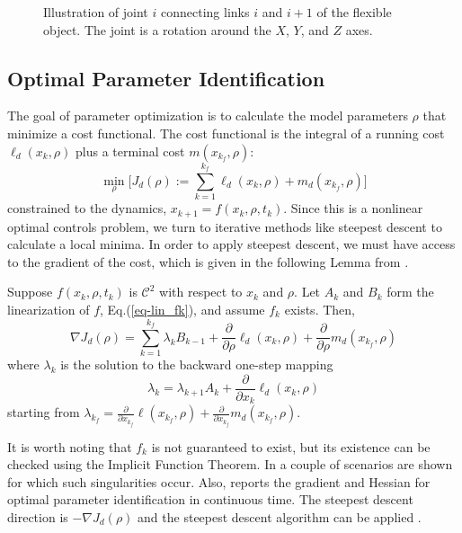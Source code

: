 \documentclass[runningheads,a4paper]{llncs}
\begin{document}
\begin{figure}[!htb]
\centering
\def\svgwidth{.80\textwidth}%

\caption{Illustration of joint $i$ connecting links $i$ and $i+1$ of the flexible object.  The joint is a rotation around the $X$, $Y$, and $Z$ axes.}
\label{fig-tube_link}
\end{figure}

\subsection{Optimal Parameter Identification \label{sec-opt}}
The goal of parameter optimization is to calculate the model parameters $\rho$ that minimize a cost functional.  The cost functional is the integral of a running cost $\ell_d(x_k,\rho)$ plus a terminal cost $m(x_{k_f},\rho)$:
\[
\min_{\rho} \Big[J_d(\rho):=\sum_{k=1}^{k_f}\ell_d(x_k,\rho) + m_d(x_{k_f},\rho)\Big]
\]
constrained to the dynamics, $x_{k+1} = f(x_k,\rho,t_k)$. Since this is a nonlinear optimal controls problem, we turn to iterative methods like steepest descent to calculate a local minima. In order to apply steepest descent, we must have access to the gradient of the cost, which is given in the following Lemma from \cite{caldwell_coleman_correll_iros}. 
\begin{lemma}
\label{lem-grad_a}
Suppose $f(x_k,\rho,t_k)$ is $\mathcal{C}^2$ with respect to $x_k$ and $\rho$.  Let $A_k$ and $B_k$ form the linearization of $f$, Eq.(\ref{eq-lin_fk}), and assume $f_k$ exists.  Then,
\begin{equation}
\nabla J_d(\rho) = \sum_{k = 1}^{k_f}\lambda_kB_{k-1} +\frac{\partial}{\partial \rho}\ell_d(x_k,\rho) + \frac{\partial}{\partial \rho}m_d(x_{k_f},\rho)
\label{eq-DJa}
\end{equation}
where $\lambda_k$ is the solution to the backward one-step mapping
\begin{equation}
\lambda_k = \lambda_{k+1}A_{k} + \frac{\partial}{\partial x_{k}}\ell_d(x_{k},\rho) 
\label{eq-lambda}
\end{equation}
starting from $\lambda_{k_f} = \frac{\partial}{\partial x_{k_f}}\ell(x_{k_f},\rho) + \frac{\partial}{\partial x_{k_f}}m_d(x_{k_f},\rho)$.  
\end{lemma}

It is worth noting that $f_k$ is not guaranteed to exist, but its existence can be checked using the Implicit Function Theorem. In \cite{johnson_schultz_murphey} a couple of scenarios are shown for which such singularities occur.  Also, \cite{miller_murphey} reports the gradient and Hessian for optimal parameter identification in continuous time. The steepest descent direction is $-\nabla J_d(\rho)$ and the steepest descent algorithm can be applied \cite{kelley}.
\end{document}

